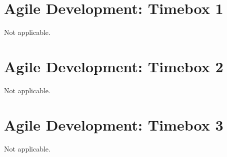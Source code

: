 \documentclass[preprint,11pt,review,authoryear]{elsarticle}
\begin{document}
\section{Agile Development: Timebox 1}
\renewcommand{\thepage}{L\arabic{page}}
\newpage
Not applicable.
\section{Agile Development: Timebox 2}
\renewcommand{\thepage}{M\arabic{page}}
\newpage
Not applicable.
\section{Agile Development: Timebox 3}
\renewcommand{\thepage}{N\arabic{page}}
\newpage
Not applicable.
\end{document}
